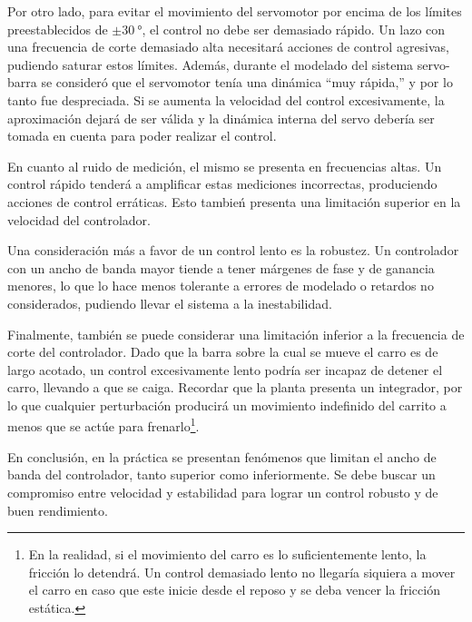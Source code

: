 Por otro lado, para evitar el movimiento del servomotor por encima de los límites preestablecidos de $\pm \qty{30}{\degree}$, el control no debe ser demasiado rápido. Un lazo con una frecuencia de corte demasiado alta necesitará acciones de control agresivas, pudiendo saturar estos límites. Además, durante el modelado del sistema servo-barra se consideró que el servomotor tenía una dinámica ``muy rápida,'' y por lo tanto fue despreciada. Si se aumenta la velocidad del control excesivamente, la aproximación dejará de ser válida y la dinámica interna del servo debería ser tomada en cuenta para poder realizar el control.

En cuanto al ruido de medición, el mismo se presenta en frecuencias altas. Un control rápido tenderá a amplificar estas mediciones incorrectas, produciendo acciones de control erráticas. Esto tambień presenta una limitación superior en la velocidad del controlador.

Una consideración más a favor de un control lento es la robustez. Un controlador con un ancho de banda mayor tiende a tener márgenes de fase y de ganancia menores, lo que lo hace menos tolerante a errores de modelado o retardos no considerados, pudiendo llevar el sistema a la inestabilidad.

Finalmente, también se puede considerar una limitación inferior a la frecuencia de corte del controlador. Dado que la barra sobre la cual se mueve el carro es de largo acotado, un control excesivamente lento podría ser incapaz de detener el carro, llevando a que se caiga. Recordar que la planta presenta un integrador, por lo que cualquier perturbación producirá un movimiento indefinido del carrito a menos que se actúe para frenarlo\footnote{En la realidad, si el movimiento del carro es lo suficientemente lento, la fricción lo detendrá. Un control demasiado lento no llegaría siquiera a mover el carro en caso que este inicie desde el reposo y se deba vencer la fricción estática.}.

En conclusión, en la práctica se presentan fenómenos que limitan el ancho de banda del controlador, tanto superior como inferiormente. Se debe buscar un compromiso entre velocidad y estabilidad para lograr un control robusto y de buen rendimiento.


